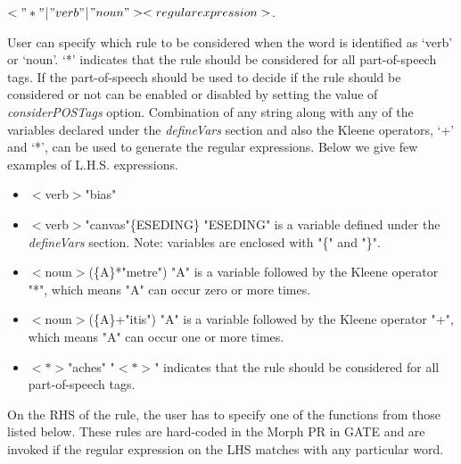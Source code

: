 $<"*" $|$ "verb" $|$ "noun"><regular expression>$.

User can specify which rule to be considered when the word is identified as
`verb' or `noun'. `*' indicates that the rule should be considered for all
part-of-speech tags. If the part-of-speech should be used to decide if the rule
should be considered or not can be enabled or disabled by setting the value of
\textit{considerPOSTags} option. Combination of any string along with any of the
variables declared under the \textit{defineVars} section and also the Kleene
operators, `+' and `*', can be used to generate the regular expressions. Below
we give few examples of L.H.S. expressions.

\begin{itemize}

\item{$<$verb$>$"bias"}

\item{$<$verb$>$"canvas"\{ESEDING\}} "ESEDING" is a variable defined under the
\textit{defineVars} section. Note: variables are enclosed with "\{" and "\}".

\item{$<$noun$>$(\{A\}*"metre")} "A" is a variable followed by the Kleene operator "*", which means "A" can occur zero or more times.

\item{$<$noun$>$(\{A\}+"itis")} "A" is a variable followed by the Kleene operator "+", which means "A" can occur one or more times.

\item{$<*>$"aches"} "$<*>$" indicates that the rule should be considered for all part-of-speech tags.

\end{itemize}


On the RHS of the rule, the user has to specify one of the functions
from those listed below. These rules are hard-coded in the Morph PR in GATE and
are invoked if the regular expression on the LHS matches with any
particular word.

